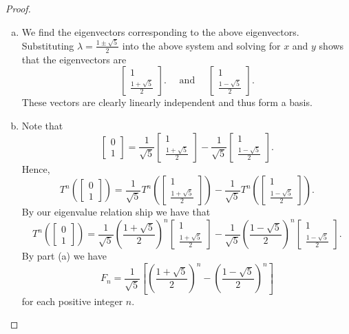 \documentclass[12pt,letterpaper]{article}
\theoremstyle{plain}
\theoremstyle{definition}
\begin{document}
\begin{enumerate}[1.]
\begin{proof}
\begin{enumerate}[(a)]
\item We find the eigenvectors corresponding to the above eigenvectors. Substituting $\lambda=\frac{1\pm \sqrt{5}}{2}$ into the above system and solving for $x$ and $y$ shows that the eigenvectors are 
\[\left[\begin{array}{cc}1\\ \frac{1+\sqrt{5}}{2}\end{array}\right].\quad\text{ and }\quad\left[\begin{array}{cc}1\\ \frac{1-\sqrt{5}}{2}\end{array}\right].\] 
These vectors are clearly linearly independent and thus form a basis.
\item Note that 
\[\left[\begin{array}{c}0\\ 1\end{array}\right]=\frac{1}{\sqrt{5}}\left[\begin{array}{cc}1\\ \frac{1+\sqrt{5}}{2}\end{array}\right]-\frac{1}{\sqrt{5}}\left[\begin{array}{c}1\\ \frac{1-\sqrt{5}}{2}\end{array}\right].\]
Hence,
\[T^n\left(\left[\begin{array}{c}0\\ 1\end{array}\right]\right)=\frac{1}{\sqrt{5}}T^n\left(\left[\begin{array}{c}1\\ \frac{1+\sqrt{5}}{2}\end{array}\right]\right)-\frac{1}{\sqrt{5}}T^n\left(\left[\begin{array}{c}1\\ \frac{1-\sqrt{5}}{2}\end{array}\right]\right).\]
By our eigenvalue relation ship we have that 
\[T^n\left(\left[\begin{array}{c}0\\ 1\end{array}\right]\right)=\frac{1}{\sqrt{5}}\left(\frac{1+\sqrt{5}}{2}\right)^n\left[\begin{array}{c}1\\ \frac{1+\sqrt{5}}{2}\end{array}\right]-\frac{1}{\sqrt{5}}\left(\frac{1-\sqrt{5}}{2}\right)^n\left[\begin{array}{c}1\\ \frac{1-\sqrt{5}}{2}\end{array}\right].\]
By part (a) we have 
\[F_n=\frac{1}{\sqrt{5}}\left[\left(\frac{1+\sqrt{5}}{2}\right)^n-\left(\frac{1-\sqrt{5}}{2}\right)^n\right]\]
for each positive integer $n$. 

\end{enumerate}

\end{proof}
\end{enumerate}
\end{document}
